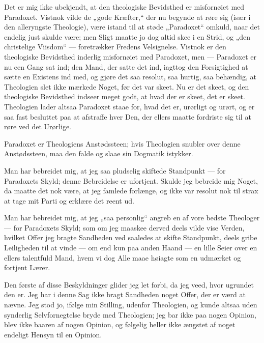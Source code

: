 \documentclass[12pt,a4paper]{book}
\newcommand{\opage}[1]{\marginnote{\footnotesize\textit{[#1]}}}
\begin{document}
Det er mig ikke ubekjendt, at den theologiske Bevidsthed er misfornøiet med
Paradoxet. Vistnok vilde de „gode Kræfter,“ der nu begynde at røre sig (især i
den alleryngste Theologie), være istand til at støde „Paradoxet“ omkuld, naar
det endelig just skulde være; men Sligt maatte jo dog altid skee i en Strid, og
„den christelige Viisdom“ --- foretrækker Fredens Velsignelse. Vistnok er den
theologiske Bevidsthed inderlig misfornøiet med Paradoxet, men --- Paradoxet er
nu een Gang sat ind; den Mand, der satte det ind, iagttog den Forsigtighed at
sætte en Existens ind med, og gjøre det saa resolut, saa hurtig, saa behændig,
at Theologien slet ikke mærkede Noget, før det var skeet. Nu er det skeet, og
den theologiske Bevidsthed indseer meget godt, at hvad der er skeet, det er
skeet. Theologien lader altsaa Paradoxet staae for, hvad det er, urørligt og
urørt, og er saa fast besluttet paa at afstraffe hver Den, der ellers maatte
fordriste sig til at røre ved det Urørlige.

Paradoxet er Theologiens Anstødssteen; hvis Theologien snubler over denne
Anstødssteen, maa den falde og slaae sin Dogmatik istykker.

Man har bebreidet mig, at jeg saa pludselig skiftede Standpunkt --- for
Paradoxets Skyld; denne Bebreidelse er ufortjent. Skulde jeg bebreide mig
Noget, da maatte det nok være, at jeg famlede forlænge, og ikke var resolut nok
til strax at tage mit Parti og erklære det reent ud.

Man har bebreidet mig, at jeg „saa personlig“ angreb en af vore bedste
Theologer --- for Paradoxets Skyld; som om jeg maaskee derved deels vilde vise
Verden, hvilket Offer jeg bragte Sandheden ved saaledes at skifte Standpunkt,
deels gribe
\opage{128} Leiligheden til at vinde --- om end kun paa anden Haand --- en lille Seier over
en ellers talentfuld Mand, hvem vi dog Alle maae høiagte som en udmærket og
fortjent Lærer.

Den første af disse Beskyldninger glider jeg let forbi, da jeg veed, hvor
ugrundet den er. Jeg har i denne Sag ikke bragt Sandheden noget Offer, der er
værd at nævne. Jeg stod jo, ifølge min Stilling, udenfor Theologien, og kunde
altsaa uden synderlig Selvfornegtelse bryde med Theologien; jeg bar ikke paa
nogen Opinion, blev ikke baaren af nogen Opinion, og følgelig heller ikke
ængstet af noget endeligt Hensyn til en Opinion.
\end{document}
